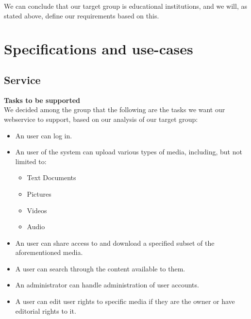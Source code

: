\documentclass[10pt,a4paper]{article}
\begin{document}
We can conclude that our target group is educational institutions, and we will, as stated above, define our requirements based on this.

\section{Specifications and use-cases}
\subsection{Service}
{\bfseries Tasks to be supported}\\
We decided among the group that the following are the tasks we want our webservice to support, based on our analysis of our target group:
\begin{itemize}
\item An user can log in.
\item An user of the system can upload various types of media, including, but not limited to:
\begin{itemize}
\item Text Documents
\item Pictures
\item Videos
\item Audio
\end{itemize}
\item An user can share access to and download a specified subset of the aforementioned  media.
\item A user can search through the content available to them.

\item An administrator can handle administration of user accounts.
\item A user can edit user rights to specific media if they are the owner or have editorial rights to it.
\end{itemize}
\end{document}
